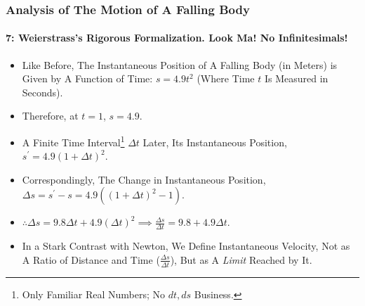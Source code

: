 \begin{frame}
\frametitle{Analysis of The Motion of \alert{A Falling Body}}
\framesubtitle{7: Weierstrass's Rigorous Formalization. Look Ma! No Infinitesimals!}
\label{slide:analysis-of-falling-body-7}
\begin{itemize}
\pause
\item Like Before, The Instantaneous Position of A Falling Body (in Meters) is Given by A Function of Time: $s=4.9t^2$ (Where Time $t$ Is Measured in Seconds).
\pause
\item Therefore, at $t=1$, $s=4.9$.
\pause
\item A \alert{Finite Time Interval\footnote{\tiny Only Familiar Real Numbers; No $dt,ds$ Business.} $\Delta t$ Later}, Its Instantaneous Position, $s^\prime=4.9(1+\Delta t)^2$.
\pause
\item Correspondingly, The Change in Instantaneous Position, $\Delta s=s^\prime-s=4.9((1+\Delta t)^2-1)$.
\pause
\item $\therefore \Delta s=9.8\Delta t+4.9(\Delta t)^2\implies\frac{\Delta s}{\Delta t}=9.8+4.9\Delta t$.
\pause
\item In a Stark Contrast with Newton, We Define Instantaneous Velocity, Not as A Ratio of Distance and Time ($\frac{\Delta s}{\Delta t}$), But as A \alert{\textit{Limit}} Reached by It.  
\end{itemize}
\end{frame}

